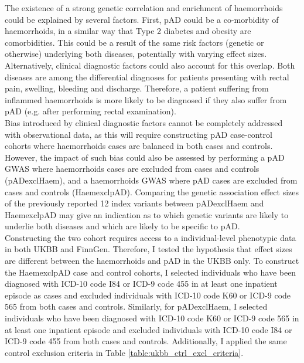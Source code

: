   The existence of a strong genetic correlation and enrichment of haemorrhoids could be explained by several factors. First, pAD could be a co-morbidity of haemorrhoids, in a similar way that Type 2 diabetes and obesity are comorbidities. This could be a result of the same risk factors (genetic or otherwise) underlying both diseases, potentially with varying effect sizes. Alternatively, clinical diagnostic factors could also account for this overlap. Both diseases are among the differential diagnoses for patients presenting with rectal pain, swelling, bleeding and discharge. Therefore, a patient suffering from inflammed haemorrhoids is more likely to be diagnosed if they also suffer from pAD (e.g. after performing rectal examination). \\ 

Bias introduced by clinical diagnostic factors cannot be completely addressed with observational data, as this will require constructing pAD case-control cohorts where haemorrhoids cases are  balanced in both cases and controls. However, the impact of such bias could also be assessed by performing a pAD GWAS where haemorrhoids cases are excluded from cases and controls (pADexclHaem), and a haemorrhoids GWAS where pAD cases are excluded from cases and controls (HaemexclpAD). Comparing the genetic association effect sizes of the previously reported 12 index variants between pADexclHaem and HaemexclpAD may give an indication as to which genetic variants are likely to underlie both diseases and which are likely to be specific to pAD. \\

Constructing the two cohort requires access to a individual-level phenotypic data in both UKBB and FinnGen. Therefore, I tested the hypothesis that effect sizes are different between the haemorrhoids and pAD in the UKBB only. To construct the HaemexclpAD case and control cohorts, I selected individuals who have been diagnosed with ICD-10 code I84 or ICD-9 code 455 in at least one inpatient episode as cases and excluded individuals with ICD-10 code K60 or ICD-9 code 565 from both cases and controls. Similarly, for pADexclHaem, I selected individuals who have been diagnosed with ICD-10 code K60 or ICD-9 code 565 in at least one inpatient episode and excluded individuals with ICD-10 code I84 or ICD-9 code 455 from both cases and controls. Additionally, I applied the same control exclusion criteria in Table \ref{table:ukbb_ctrl_excl_criteria}. 

